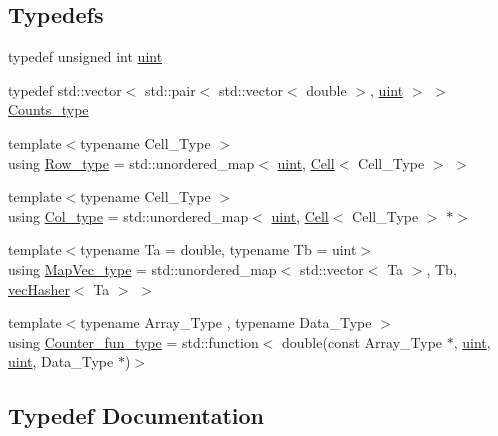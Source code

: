 \subsection*{Typedefs}
\begin{DoxyCompactItemize}
\item 
typedef unsigned int \hyperlink{namespacebarry_a11dfc53ddb4672278319aa04f1e09a6c}{uint}
\item 
typedef std\+::vector$<$ std\+::pair$<$ std\+::vector$<$ double $>$, \hyperlink{namespacebarry_a11dfc53ddb4672278319aa04f1e09a6c}{uint} $>$ $>$ \hyperlink{namespacebarry_a3e2d8c3b6cf602107559d4237d9f1315}{Counts\+\_\+type}
\item 
{\footnotesize template$<$typename Cell\+\_\+\+Type $>$ }\\using \hyperlink{namespacebarry_a8f67f2e1e26f3cb10d240b7e1a1d917c}{Row\+\_\+type} = std\+::unordered\+\_\+map$<$ \hyperlink{namespacebarry_a11dfc53ddb4672278319aa04f1e09a6c}{uint}, \hyperlink{classbarry_1_1_cell}{Cell}$<$ Cell\+\_\+\+Type $>$ $>$
\item 
{\footnotesize template$<$typename Cell\+\_\+\+Type $>$ }\\using \hyperlink{namespacebarry_adc551002e63e38057d304f78d7756308}{Col\+\_\+type} = std\+::unordered\+\_\+map$<$ \hyperlink{namespacebarry_a11dfc53ddb4672278319aa04f1e09a6c}{uint}, \hyperlink{classbarry_1_1_cell}{Cell}$<$ Cell\+\_\+\+Type $>$ $\ast$$>$
\item 
{\footnotesize template$<$typename Ta  = double, typename Tb  = uint$>$ }\\using \hyperlink{namespacebarry_a2f0d3aab1d67e4c8eaeab9022e16139f}{Map\+Vec\+\_\+type} = std\+::unordered\+\_\+map$<$ std\+::vector$<$ Ta $>$, Tb, \hyperlink{structbarry_1_1vec_hasher}{vec\+Hasher}$<$ Ta $>$ $>$
\item 
{\footnotesize template$<$typename Array\+\_\+\+Type , typename Data\+\_\+\+Type $>$ }\\using \hyperlink{namespacebarry_abaaae3200da8e4b7faac3c04fe9c3081}{Counter\+\_\+fun\+\_\+type} = std\+::function$<$ double(const Array\+\_\+\+Type $\ast$, \hyperlink{namespacebarry_a11dfc53ddb4672278319aa04f1e09a6c}{uint}, \hyperlink{namespacebarry_a11dfc53ddb4672278319aa04f1e09a6c}{uint}, Data\+\_\+\+Type $\ast$)$>$
\end{DoxyCompactItemize}


\subsection{Typedef Documentation}
\mbox{\label{namespacebarry_adc551002e63e38057d304f78d7756308}} 
